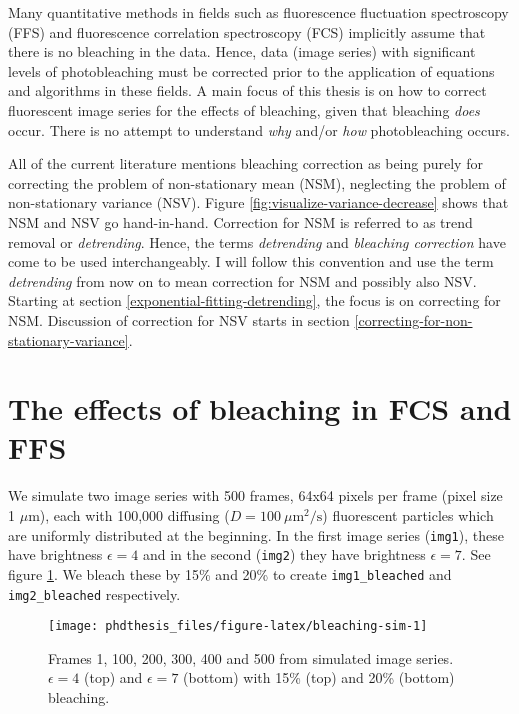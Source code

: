 \documentclass[12pt,]{book}
\theoremstyle{definition}
\theoremstyle{definition}
\theoremstyle{definition}
\theoremstyle{remark}
\let\BeginKnitrBlock\begin \let\EndKnitrBlock\end
\begin{document}
Many quantitative methods in fields such as fluorescence fluctuation
spectroscopy (FFS) and fluorescence correlation spectroscopy (FCS)
implicitly assume that there is no bleaching in the data. Hence, data
(image series) with significant levels of photobleaching must be
corrected prior to the application of equations and algorithms in these
fields. A main focus of this thesis is on how to correct fluorescent
image series for the effects of bleaching, given that bleaching
\emph{does} occur. There is no attempt to understand \emph{why} and/or
\emph{how} photobleaching occurs.

\BeginKnitrBlock{remark}
\iffalse{} {Remark. } \fi{}All of the current literature mentions
bleaching correction as being purely for correcting the problem of
non-stationary mean (NSM), neglecting the problem of non-stationary
variance (NSV). Figure \ref{fig:visualize-variance-decrease} shows that
NSM and NSV go hand-in-hand. Correction for NSM is referred to as trend
removal or \emph{detrending}. Hence, the terms \emph{detrending} and
\emph{bleaching correction} have come to be used interchangeably. I will
follow this convention and use the term \emph{detrending} from now on to
mean correction for NSM and possibly also NSV. Starting at section
\ref{exponential-fitting-detrending}, the focus is on correcting for
NSM. Discussion of correction for NSV starts in section
\ref{correcting-for-non-stationary-variance}.
\EndKnitrBlock{remark}

\section{The effects of bleaching in FCS and
FFS}\label{the-effects-of-bleaching-in-fcs-and-ffs}

We simulate two image series with 500 frames, 64x64 pixels per frame
(pixel size 1 \(\mu\)m), each with 100,000 diffusing
(\(D = 100~\mu\text{m}^2/\text{s}\)) fluorescent particles which are
uniformly distributed at the beginning. In the first image series
(\texttt{img1}), these have brightness \(\epsilon = 4\) and in the
second (\texttt{img2}) they have brightness \(\epsilon = 7\). See figure
\ref{fig:bleaching-sim}. We bleach these by 15\% and 20\% to create
\texttt{img1\_bleached} and \texttt{img2\_bleached} respectively.





\begin{figure}

\texttt{[image: phdthesis\_files/figure-latex/bleaching-sim-1]} \hfill{}

\caption{Frames 1, 100, 200, 300, 400 and 500 from
simulated image series. \(\epsilon = 4\) (top) and \(\epsilon = 7\)
(bottom) with 15\% (top) and 20\% (bottom) bleaching.}\label{fig:bleaching-sim}
\end{figure}
\end{document}
